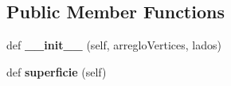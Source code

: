 \subsection*{Public Member Functions}
\begin{DoxyCompactItemize}
\item 
\mbox{\label{class_imports_1_1_triangulo_1_1_escaleno_ae78d882c311580740480848b36e2b563}} 
def {\bfseries \+\_\+\+\_\+init\+\_\+\+\_\+} (self, arreglo\+Vertices, lados)
\item 
\mbox{\label{class_imports_1_1_triangulo_1_1_escaleno_a621c4eb08304c39e70295f55cb4f5cff}} 
def {\bfseries superficie} (self)
\end{DoxyCompactItemize}
